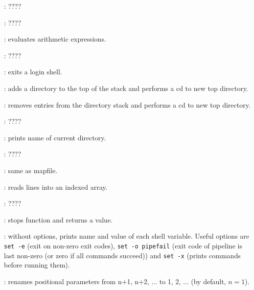 \begin{compactenum}
\item [\symbolbash] : \dotfill ????

\item [\symbolbash] : \dotfill ????

\item [\symbolbash] : evaluates arithmetic expressions.

\item [\symbolbash] : \dotfill ????

\item [\symbolbash] : exits a login shell.

\item [\symbolbash] : adds a directory to the top of the stack and performs a cd to new top directory.
\item [\symbolbash] : removes entries from the directory stack and performs a cd to new top directory.

\item [\symbolbash] : \dotfill ????

\item [\symbolbash] : prints name of current directory.

\item [\symbolbash] : \dotfill ????

\item [\symbolbash] : same as mapfile.

\item [\symbolbash] : reads lines into an indexed array.

\item [\symbolbash] : \dotfill ????

\item [\symbolbash] : stops function and returns a value.

\item [\symbolbash] : without options, prints name and value of each shell variable. Useful options are \texttt{set -e} (exit on non-zero exit codes), \texttt{set -o pipefail} (exit code of pipeline is last non-zero (or zero if all commands succeed)) and \texttt{set -x} (prints commands before running them).

\item [\symbolbash] : renames positional parameters from n+1, n+2, ... to 1, 2, ... (by default, $n = 1$).


\end{compactenum}
